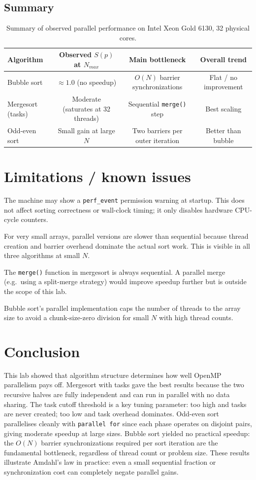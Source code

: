 \documentclass[11pt,a4paper]{article}
\begin{document}
\subsection*{Summary}
\begin{table}[H]
\centering
\begin{tabular}{lccc}
\toprule
Algorithm & Observed $S(p)$ at $N_{max}$ & Main bottleneck & Overall trend \\
\midrule
Bubble sort & $\approx 1.0$ (no speedup) & $O(N)$ barrier synchronizations & Flat / no improvement \\
Mergesort (tasks) & Moderate (saturates at 32 threads) & Sequential \texttt{merge()} step & Best scaling \\
Odd-even sort & Small gain at large $N$ & Two barriers per outer iteration & Better than bubble \\
\bottomrule
\end{tabular}
\caption{Summary of observed parallel performance on Intel Xeon Gold 6130, 32 physical cores.}
\end{table}


\section{Limitations / known issues}
The machine may show a \texttt{perf\_event} permission warning at startup. This does not affect sorting correctness or wall-clock timing; it only disables hardware CPU-cycle counters.

For very small arrays, parallel versions are slower than sequential because thread creation and barrier overhead dominate the actual sort work. This is visible in all three algorithms at small $N$.

The \texttt{merge()} function in mergesort is always sequential. A parallel merge (e.g.\ using a split-merge strategy) would improve speedup further but is outside the scope of this lab.

Bubble sort's parallel implementation caps the number of threads to the array size to avoid a chunk-size-zero division for small $N$ with high thread counts.

\section{Conclusion}
This lab showed that algorithm structure determines how well OpenMP parallelism pays off.
Mergesort with tasks gave the best results because the two recursive halves are fully independent and can run in parallel with no data sharing.
The task cutoff threshold is a key tuning parameter: too high and tasks are never created; too low and task overhead dominates.
Odd-even sort parallelises cleanly with \texttt{parallel for} since each phase operates on disjoint pairs, giving moderate speedup at large sizes.
Bubble sort yielded no practical speedup: the $O(N)$ barrier synchronizations required per sort iteration are the fundamental bottleneck, regardless of thread count or problem size.
These results illustrate Amdahl's law in practice: even a small sequential fraction or synchronization cost can completely negate parallel gains.
\end{document}

